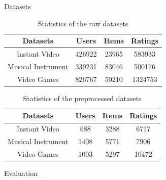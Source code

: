 \documentclass{beamer}
\begin{document}
\begin{frame}{Datasets}

\begin{table}[]
    \centering
    \begin{tabular}{cccc}
    \toprule  
    Datasets & Users & Items & Ratings\\
    \midrule  
    Instant Video & 426922 & 23965 & 583933  \\
    Musical Instrument & 339231 & 83046 & 500176  \\
    Video Games & 826767 & 50210 & 1324753  \\
    \bottomrule
    \end{tabular}
    \caption{Statistics of the raw datasets}
\end{table}


\begin{table}[]
    \centering
    \begin{tabular}{cccc}
    \toprule  
    Datasets & Users & Items & Ratings\\
    \midrule  
    Instant Video & 688 & 3288 & 6717 \\
    Musical Instrument & 1408 & 5771 & 7906 \\
    Video Games & 1003 & 5297 & 10472  \\
    \bottomrule
    \end{tabular}
    \caption{Statistics of the preprocessed datasets}
\end{table}
    
    
\end{frame}









\begin{frame}{Evaluation}


\begin{table}[htbp]
  \centering
\end{table}%

\end{frame}
\end{document}
